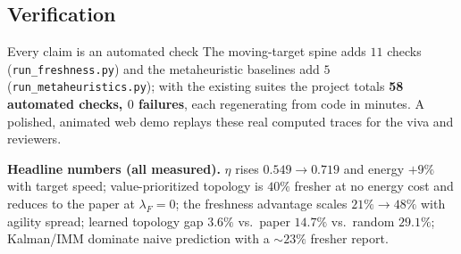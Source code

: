 \subsection{Verification}

\begin{goldbox}{Every claim is an automated check}
The moving-target spine adds $11$ checks (\texttt{run\_freshness.py}) and the
metaheuristic baselines add $5$ (\texttt{run\_metaheuristics.py}); with the
existing suites the project totals \textbf{58 automated checks, $0$ failures},
each regenerating from code in minutes. A polished, animated web demo replays
these real computed traces for the viva and reviewers.
\end{goldbox}

\noindent\textbf{Headline numbers (all measured).} $\eta$ rises $0.549\!\to\!0.719$
and energy $+9\%$ with target speed; value-prioritized topology is $40\%$ fresher
at no energy cost and reduces to the paper at $\lambda_F{=}0$; the freshness
advantage scales $21\%\!\to\!48\%$ with agility spread; learned topology gap
$3.6\%$ vs.\ paper $14.7\%$ vs.\ random $29.1\%$; Kalman/IMM dominate naive
prediction with a ${\sim}23\%$ fresher report.

